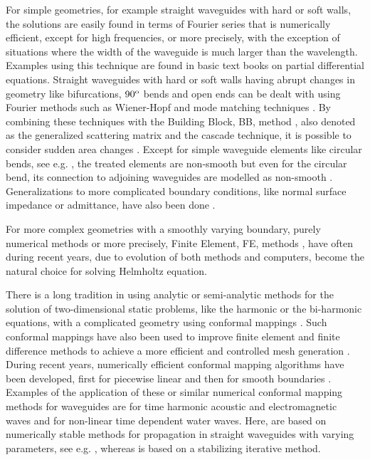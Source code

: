 \documentclass[numreferences]{kluwer}
\begin{document}
For simple geometries, for example straight waveguides with hard or
soft walls, the solutions are easily found in terms of Fourier series
that is numerically efficient, except for high frequencies, or more
precisely, with the exception of situations where the width of the
waveguide is much larger than the wavelength. Examples using this
technique are found in basic text books on partial differential
equations. Straight waveguides with hard or soft walls having abrupt
changes in geometry like bifurcations, $90^{\tiny{\rm o}}$ bends and
open ends can be dealt with using Fourier methods such as Wiener-Hopf
and mode matching techniques \cite{mittralee1971}. By combining these
techniques with the Building Block, BB, method
\cite{nilssonbrander1981b}, also denoted as the generalized scattering
matrix \cite{mittralee1971} and the cascade \cite{jones1986}
technique, it is possible to consider sudden area changes
\cite{mittralee1971,nilssonbrander1981b}. Except for simple waveguide
elements like circular bends, see e.g. \cite{bironilsson2005}, the
treated elements are non-smooth but even for the circular bend, its
connection to adjoining waveguides are modelled as non-smooth
\cite{bironilsson2005}. Generalizations to more complicated boundary
conditions, like normal surface impedance or admittance, have also
been done \cite{buyukaksoycinar2005}.

For more complex geometries with a smoothly varying boundary, purely
numerical methods or more precisely, Finite Element, FE, methods
\cite{zienkiewicz+taylor+zhu:2008,Ihlenburg:1998}, have often during
recent years, due to evolution of both methods and computers, become
the natural choice for solving Helmholtz equation.

There is a long tradition in using analytic or semi-analytic methods
for the solution of two-dimensional static problems, like the harmonic
or the bi-harmonic equations, with a complicated geometry using
conformal mappings \cite{muskhelishvili:1962}. Such conformal mappings
have also been used to improve finite element and finite difference
methods to achieve a more efficient and controlled mesh generation
\cite{ives+liutermoza:1977}. During recent years, numerically
efficient conformal mapping algorithms have been developed, first for
piecewise linear \cite{sctoolbox} and then for smooth boundaries
\cite{andersson-outpol:2008,andersson-acf:2009}. Examples of the
application of these or similar numerical conformal mapping methods
for waveguides are \cite{Andersson:2006,Andersson-Nilsson:2009} for
time harmonic acoustic and electromagnetic waves and
\cite{nachbin+daSilvaSimoes:2012} for non-linear time dependent water
waves. Here, \cite{Andersson:2006,Andersson-Nilsson:2009} are based
on numerically stable methods for propagation in straight waveguides
with varying parameters, see e.g. \cite{Fishman:1998,Nilsson:2002},
whereas \cite{nachbin+daSilvaSimoes:2012} is based on a stabilizing
iterative method.
\end{document}
